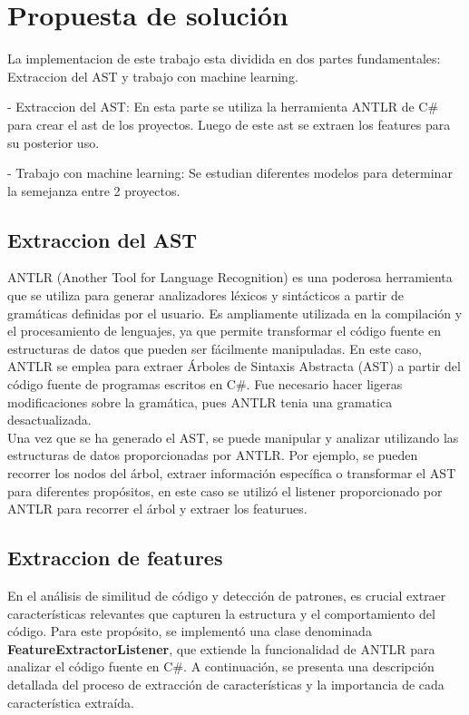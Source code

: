 \chapter{Propuesta de solución}\label{chapter:proposal}

La implementacion  de este trabajo esta dividida en dos partes fundamentales: Extraccion del AST y trabajo con machine learning.

- Extraccion del AST: En esta parte se utiliza la herramienta ANTLR de C\# para crear el ast de los proyectos. Luego de este ast se extraen los features para su posterior uso.

- Trabajo con machine learning: Se estudian diferentes modelos para determinar la semejanza entre 2 proyectos.


\section{Extraccion del AST}

ANTLR (Another Tool for Language Recognition) es una poderosa herramienta que se utiliza para generar analizadores léxicos y sintácticos a partir de gramáticas definidas por el usuario. Es ampliamente utilizada en la compilación y el procesamiento de lenguajes, ya que permite transformar el código fuente en estructuras de datos que pueden ser fácilmente manipuladas. En este caso, ANTLR se emplea para extraer Árboles de Sintaxis Abstracta (AST) a partir del código fuente de programas escritos en C\#. Fue necesario hacer ligeras modificaciones sobre la gramática, pues ANTLR tenia una gramatica desactualizada. \\

Una vez que se ha generado el AST, se puede manipular y analizar utilizando las estructuras de datos proporcionadas por ANTLR. Por ejemplo, se pueden recorrer los nodos del árbol, extraer información específica o transformar el AST para diferentes propósitos, en este caso se utilizó el listener proporcionado por ANTLR para recorrer el árbol y extraer los featurues. \\

\section{Extraccion de features}

En el análisis de similitud de código y detección de patrones, es crucial extraer características relevantes que capturen la estructura y el comportamiento del código. Para este propósito, se implementó una clase denominada {\bf FeatureExtractorListener}, que extiende la funcionalidad de ANTLR para analizar el código fuente en C\#. A continuación, se presenta una descripción detallada del proceso de extracción de características y la importancia de cada característica extraída. \\


